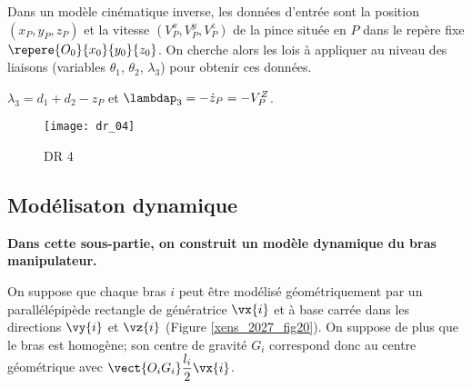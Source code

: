  Dans un modèle cinématique inverse, les données d'entrée sont la position $\left(x_P, y_P, z_P\right)$ et la
 vitesse $\left(V_P^x,V_P^y,V_P^z\right)$ de la pince située en $P$ dans le repère fixe $\repere{O_0}{x_0}{y_0}{z_0}$. On cherche  alors les lois à appliquer au niveau des liaisons (variables $\theta_1$, $\theta_2$, $\lambda_3$) pour obtenir ces données.

 \ifprof
 \begin{corrige}
 $\lambda_3 = d_1 + d_2 -z_P$ et  $\lambdap_3 = -\dot{z}_P = -V_P^Z$.
 \end{corrige}
 \else
 \fi
 
 \ifprof
 \begin{corrige}
 \end{corrige}
 \else
 \fi
 
\begin{figure}[!h]
\centering
\texttt{[image: dr\_04]}
\caption{DR 4 \label{xens_2027_dr03}}
\end{figure}


  \ifprof
 \begin{corrige}
 \end{corrige}
 \else
 \fi
 
 \subsection{Modélisaton dynamique}
\textbf{Dans cette sous-partie, on construit un modèle dynamique du bras manipulateur.}

On suppose que chaque bras $i$ peut être modélisé géométriquement par un parallélépipède
 rectangle de génératrice $\vx{i}$ et à base carrée dans les directions $\vy{i}$ et $\vz{i}$ (Figure \ref{xens_2027_fig20}). On
 suppose de plus que le bras est homogène; son centre de gravité $G_i$ correspond donc au centre
 géométrique avec $\vect{O_iG_i} \dfrac{l_i}{2} \vx{i}$.
 

